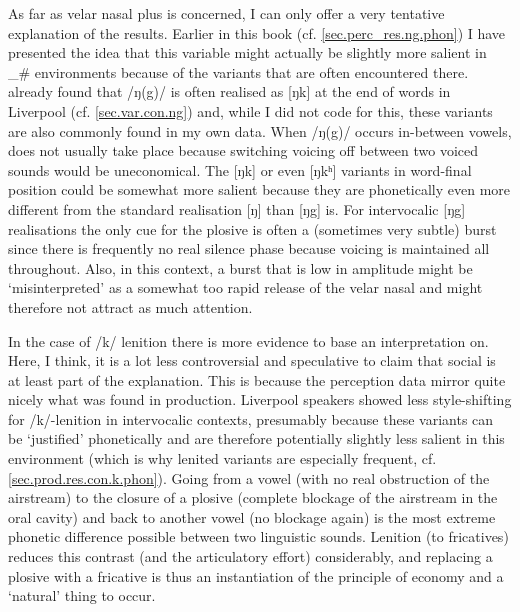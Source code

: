 As far as velar nasal plus is concerned, I can only offer a very tentative explanation of the results.
Earlier in this book (cf. \ref{sec.perc_res.ng.phon}) I have presented the idea that this variable might actually be slightly more salient in \_\# environments because of the variants that are often encountered there.
\textcite{knowles1973} already found that /ŋ(g)/ is often realised as [ŋk] at the end of words in Liverpool (cf. \ref{sec.var.con.ng}) and, while I did not code for this, these variants are also commonly found in my own data.
When /ŋ(g)/ occurs in-between vowels,  does not usually take place because switching voicing off between two voiced sounds would be uneconomical.
The [ŋk] or even [ŋkʰ] variants in word-final position could be somewhat more salient because they are phonetically even more different from the standard realisation [ŋ] than [ŋg] is.
For intervocalic [ŋg] realisations the only cue for the plosive is often a (sometimes very subtle) burst since there is frequently no real silence phase because voicing is maintained all throughout.
Also, in this context, a burst that is low in amplitude might be `misinterpreted' as a somewhat too rapid release of the velar nasal and might therefore not attract as much attention.

In the case of /k/ lenition there is more evidence to base an interpretation on.
Here, I think, it is a lot less controversial and speculative to claim that social  is at least part of the explanation.
This is because the perception data mirror quite nicely what was found in production.
Liverpool speakers showed less style-shifting for /k/-lenition in intervocalic contexts, presumably because these variants can be `justified' phonetically and are therefore potentially slightly less salient in this environment (which is why lenited variants are especially frequent, cf. \ref{sec.prod.res.con.k.phon}).
Going from a vowel (with no real obstruction of the airstream) to the closure of a plosive (complete blockage of the airstream in the oral cavity) and back to another vowel (no blockage again) is the most extreme phonetic difference possible between two linguistic sounds.
Lenition (to fricatives) reduces this contrast (and the articulatory effort) considerably, and replacing a plosive with a fricative is thus an instantiation of the principle of economy and a `natural' thing to occur.

